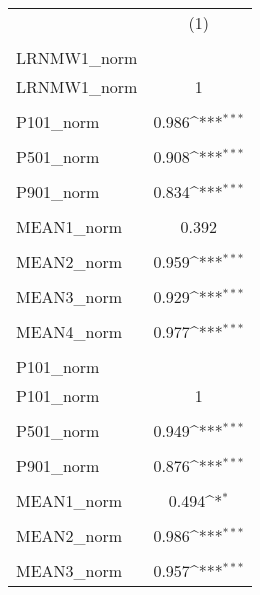 {
\def\sym#1{\ifmmode^{#1}\else\(^{#1}\)\fi}
\begin{tabular}{l*{1}{c}}
\hline\hline
            &\multicolumn{1}{c}{(1)}\\
            &\multicolumn{1}{c}{} \\
\hline
LRNMW1\_norm &                     \\
LRNMW1\_norm &           1         \\
            &                     \\
[1em]
P101\_norm   &       0.986\sym{***}\\
            &                     \\
[1em]
P501\_norm   &       0.908\sym{***}\\
            &                     \\
[1em]
P901\_norm   &       0.834\sym{***}\\
            &                     \\
[1em]
MEAN1\_norm  &       0.392         \\
            &                     \\
[1em]
MEAN2\_norm  &       0.959\sym{***}\\
            &                     \\
[1em]
MEAN3\_norm  &       0.929\sym{***}\\
            &                     \\
[1em]
MEAN4\_norm  &       0.977\sym{***}\\
            &                     \\
\hline
P101\_norm   &                     \\
P101\_norm   &           1         \\
            &                     \\
[1em]
P501\_norm   &       0.949\sym{***}\\
            &                     \\
[1em]
P901\_norm   &       0.876\sym{***}\\
            &                     \\
[1em]
MEAN1\_norm  &       0.494\sym{*}  \\
            &                     \\
[1em]
MEAN2\_norm  &       0.986\sym{***}\\
            &                     \\
[1em]
MEAN3\_norm  &       0.957\sym{***}\\

\end{tabular}}

